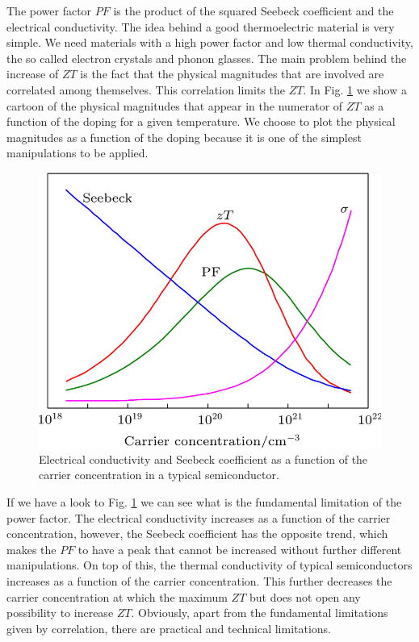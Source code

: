 The power factor $PF$ is the product of the squared Seebeck coefficient and the electrical conductivity. The idea
behind a good thermoelectric material is very simple. We need materials with a high power factor and low thermal
conductivity, the so called electron crystals and phonon glasses. The main problem behind the increase of $ZT$ 
is the fact that the physical magnitudes that are involved are correlated among themselves. This correlation limits 
the $ZT$. In Fig. \ref{decouple} we show a cartoon of the physical magnitudes that appear in the numerator of $ZT$ 
as a function of the doping for a given temperature. We choose to plot the physical magnitudes as a function of the
doping because it is one of the simplest manipulations to be applied. 
\begin{figure}[h]
\begin{center}
\includegraphics[width=0.8\linewidth]{Figures/decoupling.png}
\caption[Thermoelectric physical magnitudes]{Electrical conductivity and  Seebeck coefficient as a function of the 
carrier concentration in a typical semiconductor.}
\label{decouple}
\end{center}
\end{figure}
If we have a look to Fig. \ref{decouple} we can see what is the fundamental limitation of the power factor. The 
electrical conductivity increases as a function of the carrier concentration, however, the Seebeck coefficient has 
the opposite trend, which makes the $PF$ to have a peak that cannot be increased without further different 
manipulations. On top of this, the thermal conductivity of typical semiconductors increases as a function of the 
carrier concentration. This further decreases the carrier concentration at which the maximum $ZT$ but does not open 
any possibility to increase $ZT$. Obviously, apart from the fundamental limitations given by correlation, there are 
practical and technical limitations. \\

